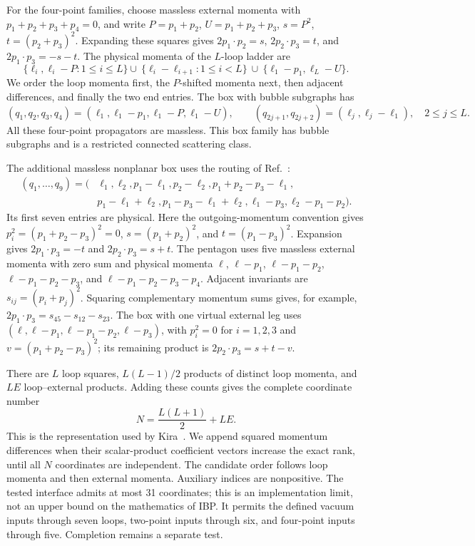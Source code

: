 For the four-point families, choose massless external momenta with $p_1+p_2+p_3+p_4=0$, and write $P=p_1+p_2$, $U=p_1+p_2+p_3$, $s=P^2$, $t=(p_2+p_3)^2$. Expanding these squares gives $2p_1\cdot p_2=s$, $2p_2\cdot p_3=t$, and $2p_1\cdot p_3=-s-t$. The physical momenta of the $L$-loop ladder are
\begin{equation}
 \{\ell_i,\ell_i-P:1\leq i\leq L\} \cup\
 \{\ell_i-\ell_{i+1}:1\leq i<L\}\ \cup\
 \{\ell_1-p_1,\ell_L-U\}.
 \label{eq:ladder-new}
\end{equation}
We order the loop momenta first, the $P$-shifted momenta next, then adjacent differences, and finally the two end entries. The box with bubble subgraphs has
\begin{equation}
 (q_1,q_2,q_3,q_4)=(\ell_1,\ell_1-p_1,\ell_1-P,\ell_1-U),\qquad
 (q_{2j+1},q_{2j+2})=(\ell_j,\ell_j-\ell_1),\quad 2\leq j\leq L.
 \label{eq:bubbles-new}
\end{equation}
All these four-point propagators are massless. This box family has bubble subgraphs and is a restricted connected scattering class.

The additional massless nonplanar box uses the routing of Ref.~\cite{KiraOriginal}:
\begin{align}
 (q_1,\ldots,q_9)=(&\ell_1,\ell_2,p_1-\ell_1,p_2-\ell_2,
 p_1+p_2-p_3-\ell_1,\nonumber\\
 &p_1-\ell_1+\ell_2,p_1-p_3-\ell_1+\ell_2,
 \ell_1-p_3,\ell_2-p_1-p_2).
 \label{eq:nonplanar-new}
\end{align}
Its first seven entries are physical. Here the outgoing-momentum convention gives $p_i^2=(p_1+p_2-p_3)^2=0$, $s=(p_1+p_2)^2$, and $t=(p_1-p_3)^2$. Expansion gives $2p_1\cdot p_3=-t$ and $2p_2\cdot p_3=s+t$. The pentagon uses five massless external momenta with zero sum and physical momenta $\ell$, $\ell-p_1$, $\ell-p_1-p_2$, $\ell-p_1-p_2-p_3$, and $\ell-p_1-p_2-p_3-p_4$. Adjacent invariants are $s_{ij}=(p_i+p_j)^2$. Squaring complementary momentum sums gives, for example, $2p_1\cdot p_3=s_{45}-s_{12}-s_{23}$. The box with one virtual external leg uses $(\ell,\ell-p_1,\ell-p_1-p_2,\ell-p_3)$, with $p_i^2=0$ for $i=1,2,3$ and $v=(p_1+p_2-p_3)^2$; its remaining product is $2p_2\cdot p_3=s+t-v$.

There are $L$ loop squares, $L(L-1)/2$ products of distinct loop momenta, and $LE$ loop--external products. Adding these counts gives the complete coordinate number
\begin{equation}
 N=\frac{L(L+1)}2+LE.
 \label{eq:count-new}
\end{equation}
This is the representation used by Kira~\cite{Kira3}. We append squared momentum differences when their scalar-product coefficient vectors increase the exact rank, until all $N$ coordinates are independent. The candidate order follows loop momenta and then external momenta. Auxiliary indices are nonpositive. The tested interface admits at most 31 coordinates; this is an implementation limit, not an upper bound on the mathematics of IBP. It permits the defined vacuum inputs through seven loops, two-point inputs through six, and four-point inputs through five. Completion remains a separate test.

